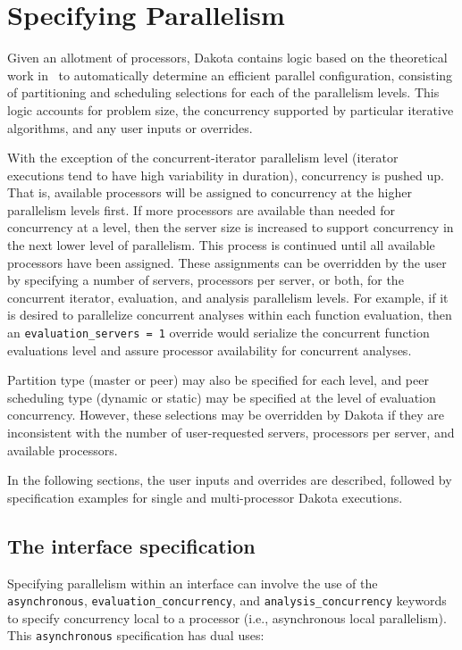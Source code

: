 \section{Specifying Parallelism}\label{parallel:spec}

Given an allotment of processors, Dakota contains logic based on the
theoretical work in~\cite{Eld00} to automatically determine an efficient
parallel configuration, consisting of partitioning and scheduling
selections for each of the parallelism levels. This logic accounts for
problem size, the concurrency supported by particular iterative
algorithms, and any user inputs or overrides. 

With the exception of the concurrent-iterator parallelism level (iterator 
executions tend to have high variability in duration), concurrency is 
pushed up. That is, available processors will be assigned to concurrency 
at the higher parallelism levels first. If more processors are available 
than needed for concurrency at a level, then the server size is 
increased to support concurrency in the next lower level of parallelism. 
This process is continued until all available processors have been 
assigned. These assignments can be overridden by the user by specifying 
a number of servers, processors per server, or both, for the concurrent 
iterator, evaluation, and analysis parallelism levels. For example, if 
it is desired to parallelize concurrent analyses within each function 
evaluation, then an \texttt{evaluation\_servers = 1} override would 
serialize the concurrent function evaluations level and assure 
processor availability for concurrent analyses.

Partition type (master or peer) may also be specified for each level, 
and peer scheduling type (dynamic or static) may be specified at the 
level of evaluation concurrency. However, these selections may be 
overridden by Dakota if they are inconsistent with the number of 
user-requested servers, processors per server, and available processors.

In the following sections, the user inputs and overrides are
described, followed by specification examples for single and
multi-processor Dakota executions.

\subsection{The interface specification}\label{parallel:spec:interface}

Specifying parallelism within an interface can involve the use of the
\texttt{asynchronous}, \texttt{evaluation\_concurrency}, and
\texttt{analysis\_concurrency} keywords to specify concurrency local
to a processor (i.e., asynchronous local parallelism). This
\texttt{asynchronous} specification has dual uses:

